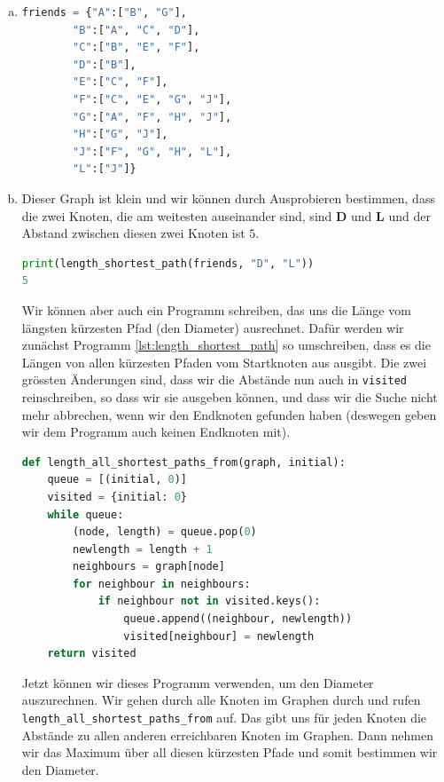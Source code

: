 \begin{enumerate}[(a)]
\begin{figure}[H]
\begin{subfigure}[h]{0.6\textwidth}
    \end{subfigure}
\end{figure}
\item 
\begin{lstlisting}[language=Python, caption={Freundschaftsgraph in der Liste der Nachbarn Darstellung.}]
friends = {"A":["B", "G"],
        "B":["A", "C", "D"],
        "C":["B", "E", "F"],
        "D":["B"],
        "E":["C", "F"],
        "F":["C", "E", "G", "J"],
        "G":["A", "F", "H", "J"],
        "H":["G", "J"],
        "J":["F", "G", "H", "L"],
        "L":["J"]}
\end{lstlisting}
\item Dieser Graph ist klein und wir können durch Ausprobieren bestimmen, dass die zwei Knoten, die am weitesten auseinander sind, sind \textbf{D} und \textbf{L} und der Abstand zwischen diesen zwei Knoten ist \(5\).
\begin{lstlisting}[language=Python]
print(length_shortest_path(friends, "D", "L"))
5
\end{lstlisting}
Wir können aber auch ein Programm schreiben, das uns die Länge vom längsten kürzesten Pfad (den Diameter) ausrechnet. Dafür werden wir zunächst Programm \ref{lst:length_shortest_path} so umschreiben, dass es die Längen von allen kürzesten Pfaden vom Startknoten aus ausgibt. Die zwei grössten Änderungen sind, dass wir die Abstände nun auch in \texttt{visited} reinschreiben, so dass wir sie ausgeben können, und dass wir die Suche nicht mehr abbrechen, wenn wir den Endknoten gefunden haben (deswegen geben wir dem Programm auch keinen Endknoten mit).
\begin{lstlisting}[language=Python, caption={Programm, welches die Abstände vom Startknoten zu allen anderen erreichbaren Knoten ausrechnet}]
def length_all_shortest_paths_from(graph, initial):
    queue = [(initial, 0)]
    visited = {initial: 0}
    while queue:
        (node, length) = queue.pop(0)
        newlength = length + 1
        neighbours = graph[node]
        for neighbour in neighbours:
            if neighbour not in visited.keys():
                queue.append((neighbour, newlength))
                visited[neighbour] = newlength
    return visited
\end{lstlisting}
Jetzt können wir dieses Programm verwenden, um den Diameter auszurechnen. Wir gehen durch alle Knoten im Graphen durch und rufen \texttt{length\_all\_shortest\_paths\_from} auf. Das gibt uns für jeden Knoten die Abstände zu allen anderen erreichbaren Knoten im Graphen. Dann nehmen wir das Maximum über all diesen kürzesten Pfade und somit bestimmen wir den Diameter.

\end{enumerate}
